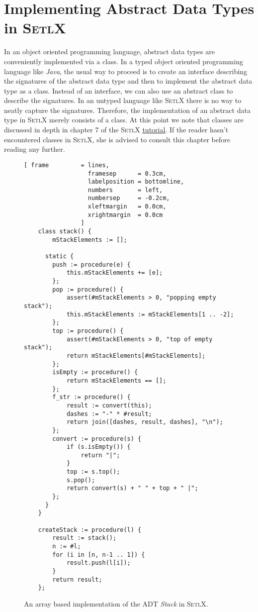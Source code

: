 \section[Implementation]{Implementing Abstract Data Types in \textsc{SetlX}}
In an object oriented programming language, abstract data types are conveniently implemented via a
class.  In a typed object oriented programming language like \textsl{Java}, the usual way to proceed
is to create an interface describing the signatures of the abstract data type and then to implement
the abstract data type as a class.  Instead of an interface, we can also use an abstract class
to describe the signatures.  In an untyped language like \textsc{SetlX} there is no way to
neatly capture the signatures.  Therefore, the implementation of an abstract data type in
\textsc{SetlX} merely consists of a class.
At this point we note that classes are discussed in depth in chapter 7 of the \textsc{SetlX} 
\href{http://wwwlehre.dhbw-stuttgart.de/~stroetma/SetlX/tutorial.pdf}{tutorial}.  If the reader
hasn't encountered classes in \textsc{SetlX}, she is advised to consult this chapter before reading
any further. 

\begin{figure}[!h]
  \centering
\begin{Verbatim}[ frame         = lines, 
                  framesep      = 0.3cm, 
                  labelposition = bottomline,
                  numbers       = left,
                  numbersep     = -0.2cm,
                  xleftmargin   = 0.0cm,
                  xrightmargin  = 0.0cm
                ]
    class stack() {
        mStackElements := [];
    
      static {  
        push := procedure(e) {
            this.mStackElements += [e];
        };
        pop := procedure() {
            assert(#mStackElements > 0, "popping empty stack");
            this.mStackElements := mStackElements[1 .. -2];
        };
        top := procedure() {
            assert(#mStackElements > 0, "top of empty stack");
            return mStackElements[#mStackElements];
        };
        isEmpty := procedure() {
            return mStackElements == [];
        };
        f_str := procedure() {
            result := convert(this);
            dashes := "-" * #result;
            return join([dashes, result, dashes], "\n");
        };
        convert := procedure(s) {
            if (s.isEmpty()) {
                return "|";
            } 
            top := s.top();
            s.pop();
            return convert(s) + " " + top + " |";
        };
      }
    }
    
    createStack := procedure(l) {
        result := stack();
        n := #l;
        for (i in [n, n-1 .. 1]) {
            result.push(l[i]);
        }
        return result;
    };
\end{Verbatim}
\vspace*{-0.3cm}
  \caption{An array based implementation of the ADT \textsl{Stack} in \textsc{SetlX}.}
  \label{fig:stack-array.stlx}
\end{figure} 

